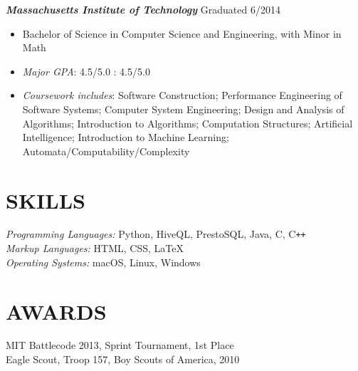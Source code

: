 \documentclass[margin]{res}
\begin{document}
\begin{resume}
                    {\sl \bf Massachusetts Institute of Technology} 
                    \hfill Graduated 6/2014
                    \begin{itemize} \itemsep -2pt %
                        \item Bachelor of Science in Computer Science
                        and Engineering, with Minor in Math
                        \item {\sl Major GPA}: 4.5/5.0  : 4.5/5.0 
                        \item {\sl Coursework includes}:
                          Software Construction;
                          Performance Engineering of Software Systems; 
                          Computer System Engineering; 
                          Design and Analysis of Algorithms; 
                          Introduction to Algorithms;
                          Computation Structures;
                          Artificial Intelligence; 
                          Introduction to Machine Learning; 
                          Automata/Computability/Complexity
                    \end{itemize}

\section{SKILLS}    {\sl Programming Languages:} Python, HiveQL, PrestoSQL, Java, C,
                      C\texttt{++} \\
                    {\sl Markup Languages:} HTML, CSS, \LaTeX \\
                    {\sl Operating Systems:} macOS, Linux, Windows
 
 
\section{AWARDS}    MIT Battlecode 2013, Sprint Tournament, 1st Place\\
                    Eagle Scout, Troop 157, Boy Scouts of America, 2010

\end{resume}
\end{document}
